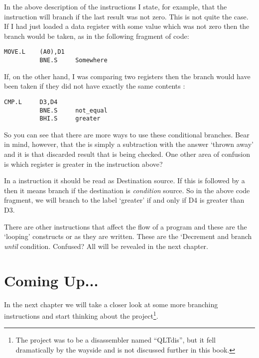 In the above description of the  instructions I state, for
    example, that the  instruction will branch if the last result was not
    zero. This is not quite the case. If I had just loaded a data register
    with some value which was not zero then the branch would be taken, as in
    the following fragment of code:

\begin{lstlisting}[firstnumber=1,]
          MOVE.L    (A0),D1 
          BNE.S     Somewhere 
\end{lstlisting}

If, on the other hand, I was comparing two registers then the branch
    would have been taken if they did not have exactly the same contents
   :

\begin{lstlisting}[firstnumber=1,]
          CMP.L     D3,D4 
          BNE.S     not_equal
          BHI.S     greater
\end{lstlisting}

So you can see that there are more ways to use these conditional
    branches. Bear in mind, however, that the  is simply a subtraction with
    the answer `thrown away' and it is that discarded result that is being checked. One
    other area of confusion is which register is greater in the 
    instruction above?

In a  instruction it should be read as Destination  source. If this is
followed by a  then it means branch if the destination is
\emph{condition} source. So in the above code fragment, we will branch to
the label `greater' if and only if D4 is greater than D3.

There are other instructions that affect the flow of a program and
    these are the `looping' constructs or  as they are written. These are
    the `Decrement and branch \emph{until} condition. Confused? All will be revealed
    in the next chapter.

\section{Coming Up...}
\label{ch2-the-end}%

In the next chapter we will take a closer
    look at some more branching instructions and start thinking about the project\footnote{The project was to be a disassembler named ``QLTdis'', but it fell dramatically by the wayside and is not discussed further in this book.}.
